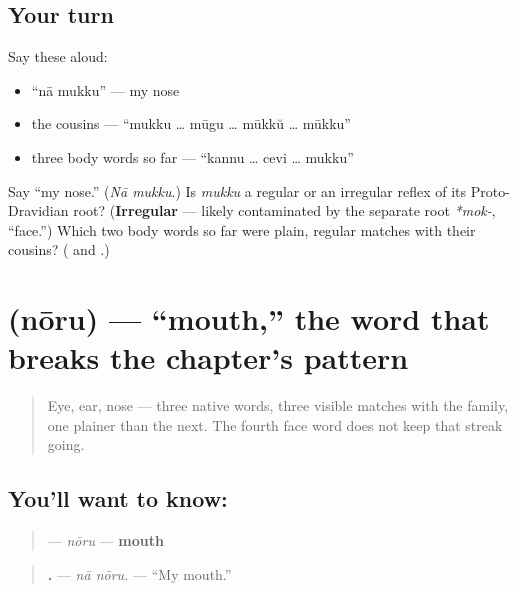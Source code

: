 \subsection*{Your turn}
Say these aloud:

\begin{itemize}
\raggedright
  \item \textquotedblleft{}nā mukku\textquotedblright{} — my nose
  \item the cousins — \textquotedblleft{}mukku … mūgu … mūkkŭ … mūkku\textquotedblright{}
  \item three body words so far — \textquotedblleft{}kannu … cevi … mukku\textquotedblright{}
\end{itemize}

\begin{tcolorbox}[breakable,colback=teal!4,colframe=teal!35!black,title={Before you move on}]
Say \textquotedblleft{}my nose.\textquotedblright{} (\emph{Nā mukku}.) Is \emph{mukku} a regular or an irregular reflex of its Proto-Dravidian root? (\textbf{Irregular} — likely contaminated by the separate root \emph{*mok-}, \textquotedblleft{}face.\textquotedblright{}) Which two body words so far were plain, regular matches with their cousins? (\textbf{} and \textbf{}.)
\end{tcolorbox}
\section[\texorpdfstring{\te{నోరు} (nōru)}{నోరు (nōru)}]{ (nōru) — \textquotedblleft{}mouth,\textquotedblright{} the word that breaks the chapter's pattern}

\label{lesson:TE-C37-noru}



\begin{quote}
Eye, ear, nose — three native words, three visible matches with the family, one plainer than the next. The fourth face word does not keep that streak going.
\end{quote}

\subsection*{You'll want to know: }
\begin{quote}
\textbf{} — \emph{nōru} — \textbf{mouth}
\end{quote}

\begin{quote}
\textbf{ .} — \emph{nā nōru.} — \textquotedblleft{}My mouth.\textquotedblright{}
\end{quote}

